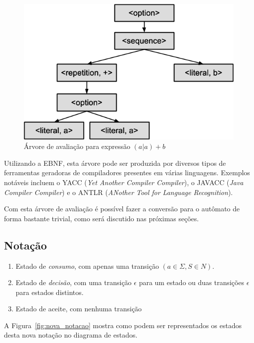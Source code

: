 \documentclass[a4paper,12pt,oneside,onecolumn]{uerj}
\begin{document}
\begin{figure}[!htbp]
  \centering
  \includegraphics[scale=0.5]{figures/aab_parse_tree.png}
  \caption{Árvore de avaliação para expressão $(a|a)+b$}
  \label{fig:aab_parse_tree}
\end{figure}

Utilizando a EBNF, esta árvore pode ser produzida por diversos tipos de ferramentas geradoras de compiladores presentes em várias linguagens. Exemplos notáveis incluem o YACC (\emph{Yet Another Compiler Compiler}), o JAVACC (\emph{Java Compiler Compiler}) e o ANTLR (\emph{ANother Tool for Language Recognition}).

Com esta árvore de avaliação é possível fazer a conversão para o autômato de forma bastante trivial, como será discutido nas próximas seções.

\subsection{Notação}
\label{sec:Notacao}

\begin{enumerate}
    \item Estado de \emph{consumo},  com apenas uma transição $(a \in \Sigma, S \in N)$.
    \item Estado de \emph{decisão}, com uma transição $\epsilon$ para um estado ou duas transições $\epsilon$ para estados distintos.
    \item Estado de aceite, com nenhuma transição
\end{enumerate}

A Figura~\ref{fig:nova_notacao} mostra como podem ser representados os estados desta nova notação no diagrama de estados.
\end{document}
